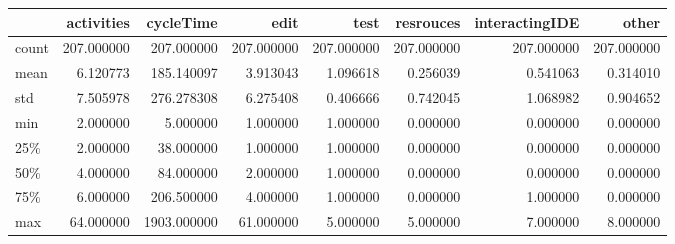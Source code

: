 \begin{tabular}{lrrrrrrr}
\toprule
{} &  activities &    cycleTime &        edit &        test &   resrouces &  interactingIDE &       other \\
\midrule
count &  207.000000 &   207.000000 &  207.000000 &  207.000000 &  207.000000 &      207.000000 &  207.000000 \\
mean  &    6.120773 &   185.140097 &    3.913043 &    1.096618 &    0.256039 &        0.541063 &    0.314010 \\
std   &    7.505978 &   276.278308 &    6.275408 &    0.406666 &    0.742045 &        1.068982 &    0.904652 \\
min   &    2.000000 &     5.000000 &    1.000000 &    1.000000 &    0.000000 &        0.000000 &    0.000000 \\
25\%   &    2.000000 &    38.000000 &    1.000000 &    1.000000 &    0.000000 &        0.000000 &    0.000000 \\
50\%   &    4.000000 &    84.000000 &    2.000000 &    1.000000 &    0.000000 &        0.000000 &    0.000000 \\
75\%   &    6.000000 &   206.500000 &    4.000000 &    1.000000 &    0.000000 &        1.000000 &    0.000000 \\
max   &   64.000000 &  1903.000000 &   61.000000 &    5.000000 &    5.000000 &        7.000000 &    8.000000 \\
\bottomrule
\end{tabular}
